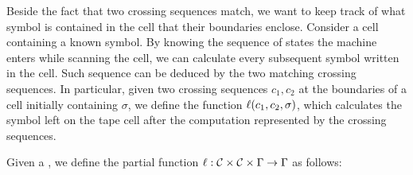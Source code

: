 Beside the fact that two crossing sequences match, we want to keep track of what symbol is contained in the cell that their boundaries enclose.
Consider a cell containing a known symbol.
By knowing the sequence of states the machine enters while scanning the cell, we can calculate every subsequent symbol written in the cell.
Such sequence can be deduced by the two matching crossing sequences.
In particular, given two crossing sequences $c_1,c_2$ at the boundaries of a cell initially containing $\sigma$, we define the function $\ell(c_1,c_2,\sigma)$, which calculates the symbol left on the tape cell after the computation represented by the crossing sequences.
\begin{defn}
	Given a \kDLA, we define the partial function $\ell:\mathcal C\times\mathcal C\times\Gamma\to\Gamma$ as follows:


\end{defn}
